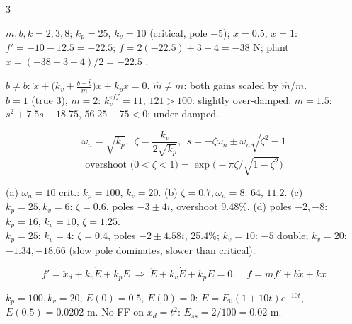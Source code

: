 \begin{multicols}{3}
\begin{worked}
$m,b,k=2,3,8$; $k_p=25$, $k_v=10$ (critical, pole $-5$); $x=0.5$, $\dot x=1$: $f'=-10-12.5=-22.5$; $f=2(-22.5)+3+4=-38$ N; plant $\ddot x=(-38-3-4)/2=-22.5$ \checkmark. \chk
\end{worked}
\begin{fbx}
$\hat b\ne b$: $\ddot x+\big(k_v+\tfrac{b-\hat b}m\big)\dot x+k_px=0$. $\hat m\ne m$: both gains scaled by $\hat m/m$.\\
$\hat b=1$ (true 3), $m=2$: $k_v^{eff}=11$, $121>100$: slightly over-damped. $\hat m=1.5$: $s^2+7.5s+18.75$, $56.25-75<0$: under-damped. \chk
\end{fbx}

\begin{fbx}
\[\omega_n=\sqrt{k_p},\ \ \zeta=\frac{k_v}{2\sqrt{k_p}},\ \ s=-\zeta\omega_n\pm\omega_n\sqrt{\zeta^2-1}\]
\[\text{overshoot (}0<\zeta<1\text{)}=\exp\!\big(-\pi\zeta/\sqrt{1-\zeta^2}\big)\]
\end{fbx}
(a) $\omega_n=10$ crit.: $k_p=100$, $k_v=20$. (b) $\zeta=0.7,\omega_n=8$: $64$, $11.2$. (c) $k_p=25,k_v=6$: $\zeta=0.6$, poles $-3\pm4i$, overshoot $9.48\%$. (d) poles $-2,-8$: $k_p=16$, $k_v=10$, $\zeta=1.25$. \chk\\
$k_p=25$: $k_v=4$: $\zeta=0.4$, poles $-2\pm4.58i$, 25.4\%; $k_v=10$: $-5$ double; $k_v=20$: $-1.34,-18.66$ (slow pole dominates, slower than critical). \chk

\begin{fbx}
\[f'=\ddot x_d+k_v\dot E+k_pE\ \Rightarrow\ \ddot E+k_v\dot E+k_pE=0,\quad f=mf'+b\dot x+kx\]
\end{fbx}
$k_p=100,k_v=20$, $E(0)=0.5$, $\dot E(0)=0$: $E=E_0(1+10t)e^{-10t}$, $E(0.5)=0.0202$ m. No FF on $x_d=t^2$: $E_{ss}=2/100=0.02$ m. \chk


\end{multicols}
